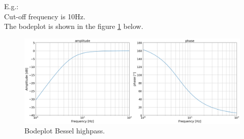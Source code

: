 E.g.: \\
Cut-off frequency is 10Hz.\\
The bodeplot is shown in the figure \ref{fig:hp_bessel} below.
\begin{figure}[h!]
	\includegraphics[width=.75\linewidth]{hp_bessel.png}
	\caption{Bodeplot Bessel highpass.}
	\label{fig:hp_bessel}
\end{figure}